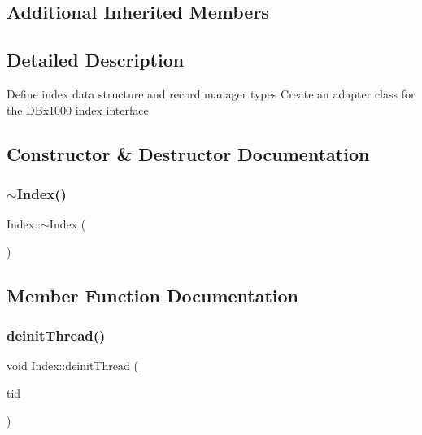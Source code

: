 \subsection*{Additional Inherited Members}


\subsection{Detailed Description}
Define index data structure and record manager types Create an adapter class for the D\+Bx1000 index interface 

\subsection{Constructor \& Destructor Documentation}
\mbox{\label{classIndex_a76b7ed4e9cb0b1540264567f84896032}} 
\subsubsection{\texorpdfstring{$\sim$\+Index()}{~Index()}}
{\footnotesize\ttfamily Index\+::$\sim$\+Index (\begin{DoxyParamCaption}{ }\end{DoxyParamCaption})\hspace{0.3cm}{\ttfamily [inline]}}



\subsection{Member Function Documentation}
\mbox{\label{classIndex_a62ecc92aa23b7292ea6735ff9ac21c80}} 
\subsubsection{\texorpdfstring{deinit\+Thread()}{deinitThread()}\hspace{0.1cm}{\footnotesize\ttfamily [1/2]}}
{\footnotesize\ttfamily void Index\+::deinit\+Thread (\begin{DoxyParamCaption}\item[{const int}]{tid }\end{DoxyParamCaption})}

